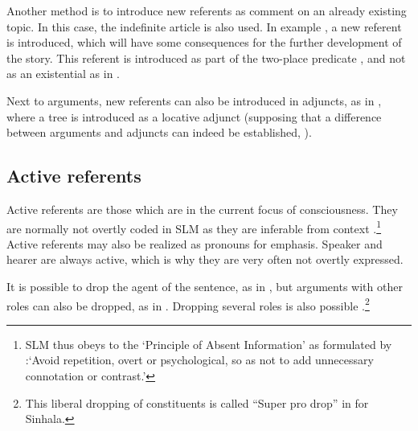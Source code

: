 Another method is to introduce new referents as comment on an already existing topic. In this case, the indefinite article is also used. In example , a new referent  is introduced, which will have some consequences for the further development of the story. This referent is introduced as part of the two-place predicate , and not as an existential as in .

  

Next to arguments, new referents can also be introduced in adjuncts, as in , where a tree is introduced as a locative adjunct (supposing that a difference between arguments and adjuncts can indeed be established,  ).




\subsection{Active referents}\label{sec:disc:Activereferents}
Active referents are those which are in the current focus of consciousness. They are normally not overtly coded in SLM as they are inferable from context \citep{SmithEtAl2004}.\footnote{SLM thus obeys to the `Principle of Absent Information' as formulated by \citet[305]{Minegishi2004}:`Avoid repetition, overt or psychological, so as not to add unnecessary connotation or contrast.'}   Active referents may also be realized as pronouns for emphasis. Speaker and hearer are always active, which is why they are very often not overtly expressed.

It is possible to drop the agent of the sentence, as in , but arguments with other roles can also be dropped, as in . Dropping several roles is also possible .\footnote{This liberal dropping of constituents is called ``Super pro drop'' in \citet{GairEtAl1989Sinhalaacquisition} for Sinhala.}

